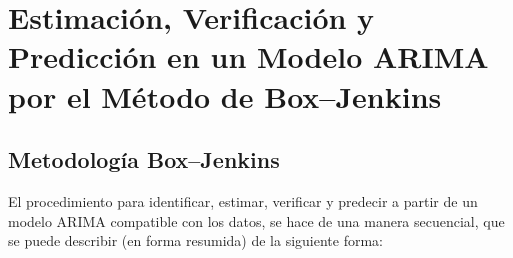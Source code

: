 \chapter[Estimaci\'{o}n, Verificaci\'{o}n y Predicci\'{o}n en un Modelo ARIMA]{Estimaci\'{o}n, Verificaci\'{o}n y Predicci\'{o}n en un Modelo ARIMA por el  M\'{e}todo de Box--Jenkins}

\section{Metodolog\'{i}a Box--Jenkins}

El procedimiento para  identificar, estimar, verificar y predecir a partir de un modelo ARIMA compatible con los datos, se hace de una manera secuencial, que se puede describir (en forma resumida) de la siguiente forma:

